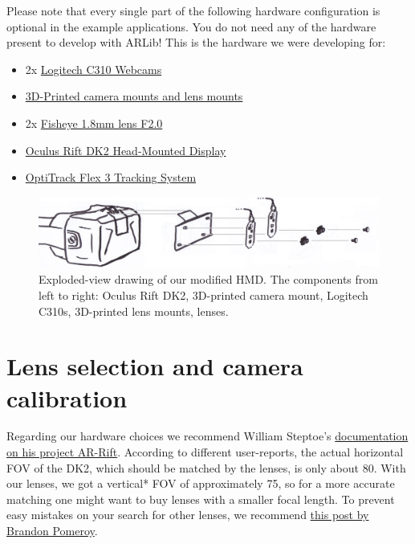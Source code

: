 Please note that every single part of the following hardware
configuration is optional in the example applications. You do not need
any of the hardware present to develop with ARLib! This is the hardware we were
developing for:
\begin{itemize}
	\item{2x \href{http://www.logitech.com/de-de/product/hd-webcam-c310}{Logitech C310 Webcams}}
	\item{\href{https://github.com/ands/OculusMeetsAR/tree/master/Hardware/Printmodels}{3D-Printed camera mounts and lens mounts}}
	\item{2x \href{http://www.camera2000.com/en/cctv-board-security-video-camera-1-8mm-lens-f2-0.html}{Fisheye 1.8mm lens F2.0}}
	\item{\href{https://www.oculus.com/dk2/}{Oculus Rift DK2 Head-Mounted Display}}
	\item{\href{http://www.optitrack.com/products/flex-3/}{OptiTrack Flex 3 Tracking System}}
\end{itemize}

\begin{figure}[htb!]
	\centering
	\includegraphics{explosion}
	\vspace{1mm}
	\caption{Exploded-view drawing of our modified HMD. The components from left to right: Oculus Rift DK2, 3D-printed camera mount, Logitech C310s, 3D-printed lens mounts, lenses.}
	\label{fig:explosion}
\end{figure}

\section{Lens selection and camera calibration}\label{lens-selection-and-camera-calibration}

Regarding our hardware choices we recommend William Steptoe's
\href{http://willsteptoe.com/post/67399683294/ar-rift-camera-selection-part-2}{documentation
on his project AR-Rift}. According to different user-reports, the actual
horizontal FOV of the DK2, which should be matched by the lenses, is
only about 80\textdegree. With our lenses, we got a vertical* FOV of
approximately 75\textdegree, so for a more accurate matching one might want to buy
lenses with a smaller focal length. To prevent easy mistakes on your
search for other lenses, we recommend
\href{http://pomeroyprinting.blogspot.de/2014/04/modifying-logitech-c310-hd-webcam.html}{this
post by Brandon Pomeroy}.

